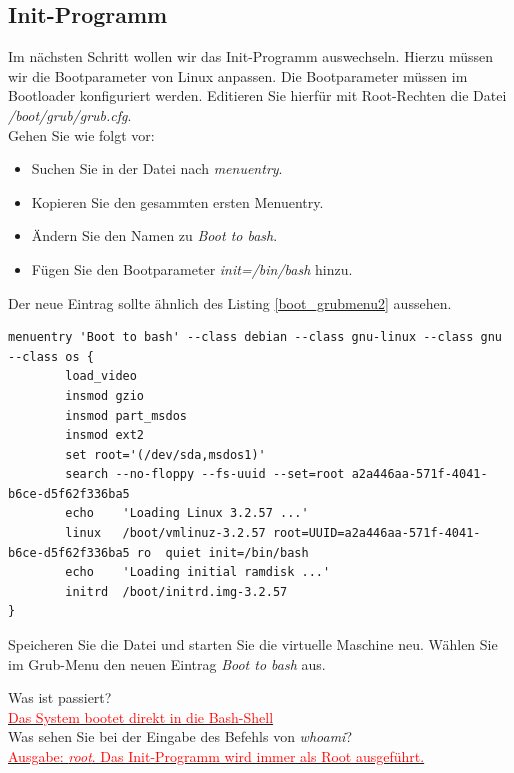 \subsection{Init-Programm}

Im nächsten Schritt wollen wir das Init-Programm auswechseln. Hierzu müssen wir die 
Bootparameter von Linux anpassen. Die Bootparameter müssen im Bootloader konfiguriert 
werden. Editieren Sie hierfür mit Root-Rechten
die Datei \emph{/boot/grub/grub.cfg}. \\

Gehen Sie wie folgt vor:
\begin{itemize}
   \item Suchen Sie in der Datei nach \emph{menuentry}.
   \item Kopieren Sie den gesammten ersten Menuentry.
   \item Ändern Sie den Namen zu \emph{Boot to bash}.
   \item Fügen Sie den Bootparameter \emph{init=/bin/bash} hinzu.
\end{itemize}

Der neue Eintrag sollte ähnlich des Listing \ref{boot_grubmenu2} aussehen.

\begin{lstlisting}[label=boot_grubmenu2,caption=/boot/grub/grub.cfg]
menuentry 'Boot to bash' --class debian --class gnu-linux --class gnu --class os {
        load_video
        insmod gzio
        insmod part_msdos
        insmod ext2
        set root='(/dev/sda,msdos1)'
        search --no-floppy --fs-uuid --set=root a2a446aa-571f-4041-b6ce-d5f62f336ba5
        echo    'Loading Linux 3.2.57 ...'
        linux   /boot/vmlinuz-3.2.57 root=UUID=a2a446aa-571f-4041-b6ce-d5f62f336ba5 ro  quiet init=/bin/bash
        echo    'Loading initial ramdisk ...'
        initrd  /boot/initrd.img-3.2.57
}
\end{lstlisting}

Speicheren Sie die Datei und starten Sie die virtuelle Maschine neu. Wählen Sie im Grub-Menu den
neuen Eintrag \emph{Boot to bash} aus.

\clearpage

Was ist passiert? \\

\underline{\textcolor{red}{Das System bootet direkt in die Bash-Shell}\hspace{0.5\textwidth}} \\


Was sehen Sie bei der Eingabe des Befehls von \emph{whoami}? \\

\underline{\textcolor{red}{Ausgabe: \emph{root}. Das Init-Programm wird immer als Root ausgeführt.}\hspace{0.23\textwidth}}

